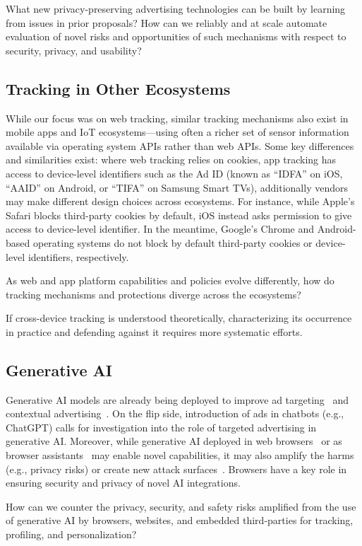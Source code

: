 \begin{opbox}
What new privacy-preserving advertising technologies can be built by learning from issues in prior proposals? How can we reliably and at scale automate evaluation of novel risks and opportunities of such mechanisms with respect to security, privacy, and usability?
\end{opbox}




\subsection{Tracking in Other Ecosystems}

While our focus was on web tracking, similar tracking mechanisms also exist in mobile apps and IoT ecosystems---using often a richer set of sensor information available via operating system APIs rather than web APIs. Some key differences and similarities exist: where web tracking relies on cookies, app tracking has access to device-level identifiers such as the Ad ID (known as ``IDFA'' on iOS, ``AAID'' on Android, or ``TIFA'' on Samsung Smart TVs), additionally vendors may make different design choices across ecosystems. For instance, while Apple's Safari blocks third-party cookies by default, iOS instead asks permission  to give access to device-level identifier. In the meantime, Google's Chrome and Android-based operating systems do not block by default third-party cookies or device-level identifiers, respectively.  


\begin{opbox}
As web and app platform capabilities and policies evolve differently, how do tracking mechanisms and protections diverge across the ecosystems? 
\end{opbox}


\begin{opbox}
If cross-device tracking is understood theoretically, characterizing its occurrence in practice and defending against it requires more systematic efforts.
\end{opbox}

\subsection{Generative AI}
Generative AI models are already being deployed to improve ad targeting~\cite{adv-week-genai-targeting} and contextual advertising~\cite{cognitiv2024cookieless}. 
%
On the flip side, introduction of ads in chatbots (e.g., ChatGPT) calls for investigation into the role of targeted advertising in generative AI.
%
Moreover, while generative AI deployed in web browsers~\cite{google2024chromeai} or as browser assistants~\cite{vekaria2025big} may enable novel capabilities, it may also amplify the harms (e.g., privacy risks) or create new attack surfaces~\cite{mcp-security}. 
%
Browsers have a key role in ensuring security and privacy of novel AI integrations.

\begin{opbox}
How can we counter the privacy, security, and safety risks amplified from the use of generative AI by browsers, websites, and embedded third-parties for tracking, profiling, and personalization?
\end{opbox}